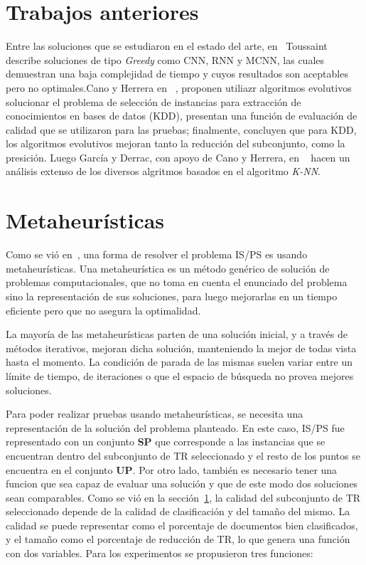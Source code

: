\documentclass{ci5652}
\begin{document}
\section{Trabajos anteriores}
\label{sect:works}

Entre las soluciones que se estudiaron en el estado del arte, en~\cite{toussaint2002proximity} Toussaint describe soluciones de tipo \textit{Greedy} como CNN, RNN y MCNN, las cuales demuestran una baja complejidad de tiempo y cuyos resultados son aceptables pero no optimales.Cano y Herrera en ~\cite{1255391}, proponen utiliazr algoritmos evolutivos solucionar el problema de selección de instancias para extracción de conocimientos en bases de datos (KDD), presentan una función de evaluación de calidad que se utilizaron para las pruebas; finalmente, concluyen que para KDD, los algoritmos evolutivos mejoran tanto la reducción del subconjunto, como la presición. Luego García y Derrac, con apoyo de Cano y Herrera, en ~\cite{garcia2012prototype} hacen un análisis extenso de los diversos algritmos basados en el algoritmo \textit{K-NN}.

\section{Metaheurísticas}
\label{sect:meta}

Como se vió en~\cite{1255391}, una forma de resolver el problema IS/PS es usando metaheurísticas. Una metaheurística es un método genérico de solución de problemas computacionales, que no toma en cuenta el enunciado del problema sino la representación de sus soluciones, para luego mejorarlas en un tiempo eficiente pero que no asegura la optimalidad.

La mayoría de las metaheurísticas parten de una solución inicial, y a través de métodos iterativos, mejoran dicha solución, manteniendo la mejor de todas vista hasta el momento. La condición de parada de las mismas suelen variar entre un límite de tiempo, de iteraciones o que el espacio de búsqueda no provea mejores soluciones.

Para poder realizar pruebas usando metaheurísticas, se necesita una representación de la solución del problema planteado. En este caso, IS/PS fue representado con un conjunto \textbf{SP} que corresponde a las instancias que se encuentran dentro del subconjunto de TR seleccionado y el resto de los puntos se encuentra en el conjunto \textbf{UP}. Por otro lado, también es necesario tener una funcion que sea capaz de evaluar una solución y que de este modo dos soluciones sean comparables. Como se vió en la sección~\ref{sect:works}, la calidad del subconjunto de TR seleccionado depende de la calidad de clasificación y del tamaño del mismo. La calidad se puede representar como el porcentaje de documentos bien clasificados, y el tamaño como el porcentaje de reducción de TR, lo que genera una función con dos variables. Para los experimentos se propusieron tres funciones:
\end{document}
